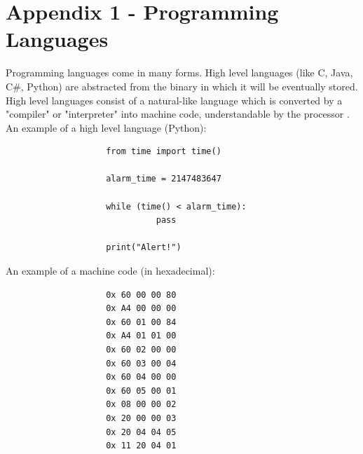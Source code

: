 \documentclass[a4]{report}
\begin{document}
\section{Appendix 1 -  Programming Languages}
Programming languages come in many forms. High level languages (like C, Java, C\#, Python) are abstracted from the binary in which it will be eventually stored. High level languages consist of a natural-like language which is converted by a "compiler" or "interpreter" into machine code, understandable by the processor \cite{proglanghighlow}.\newline \newline  \noindent
\noindent
An example of a high level language (Python):
\begin{verbatim}
                    from time import time()

                    alarm_time = 2147483647

                    while (time() < alarm_time):
                              pass

                    print("Alert!")
\end{verbatim}
An example of a machine code (in hexadecimal)\cite{proglangmachex}:
\begin{verbatim}
                    0x 60 00 00 80
                    0x A4 00 00 00
                    0x 60 01 00 84
                    0x A4 01 01 00
                    0x 60 02 00 00
                    0x 60 03 00 04
                    0x 60 04 00 00
                    0x 60 05 00 01
                    0x 08 00 00 02
                    0x 20 00 00 03
                    0x 20 04 04 05
                    0x 11 20 04 01
\end{verbatim}
\end{document}
